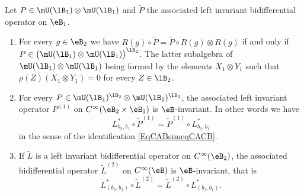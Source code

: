 \begin{proposition}		\label{PropPBBPtildeComm}
	Let $P\in\mU(\lB_1)\otimes\mU(\lB_1)$ and $\tilde P$ the associated left invariant bidifferential operator on $\eB_1$.
	\begin{enumerate}

		\item\label{ItemPropPBBPtildeCommi}
			For every $g\in\eB_2$ we have $R(g)\circ\tilde P=\tilde P\circ R(g)\otimes R(g)$ if and only if $P\in\big( \mU(\lB_1)\otimes\mU(\lB_1) \big)^{\lB_2}$. The latter subalgebra of $\mU(\lB_1)\otimes\mU(\lB_1)$ being formed by the elements $X_1\otimes Y_1$ such that $\rho(Z)(X_1\otimes Y_1)=0$ for every $Z\in\lB_2$.

		\item\label{ItemPropPBBPtildeCommii}
			For every $P\in\mU(\lB_1)^{\lB_2}\otimes\mU(\lB_1)^{\lB_2}$, the associated left invariant operator $P^{(1)}$ on $ C^{\infty}(\eB_2\times \eB_1)$ is $\eB$-invariant. In other words we have
			\begin{equation}
				L^*_{b_2,b_1}\circ\tilde P^{(1)}=\tilde P^{(1)}\circ L^*_{b_2,b_1}
			\end{equation}
			in the sense of the identification \eqref{EqCABsimeqCACB}.
		\item\label{ItemPropPBBPtildeCommiii}
			If $\tilde L$ is a left invariant bidifferential operator on $ C^{\infty}(\eB_2)$, the associated bidifferential operator $\tilde L^{(2)}$ on $ C^{\infty}(\eB)$ is $\eB$-invariant, that is
			\begin{equation}
				L^*_{(b_2,b_1)}\circ \tilde L^{(2)}=\tilde L^{(2)}\circ L^*_{(b_2,b_1)}.
			\end{equation}
	\end{enumerate}

\end{proposition}

